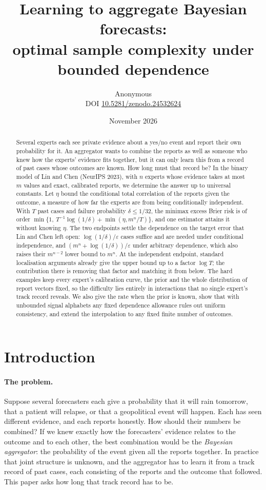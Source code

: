 \documentclass[11pt,a4paper]{article}
\title{Learning to aggregate Bayesian forecasts:\\ optimal sample complexity under bounded dependence}
\author{Anonymous\\[3pt]{\small DOI \href{https://doi.org/10.5281/zenodo.24532624}{10.5281/zenodo.24532624}}}
\date{November 2026}
\theoremstyle{remark}
\newcommand{\eps}{\varepsilon}
\begin{document}
\maketitle
\begin{abstract}
Several experts each see private evidence about a yes/no event and report their own probability for it. An aggregator wants to combine the reports as well as someone who knew how the experts' evidence fits together, but it can only learn this from a record of past cases whose outcomes are known. How long must that record be? In the binary model of Lin and Chen (NeurIPS 2023), with $n$ experts whose evidence takes at most $m$ values and exact, calibrated reports, we determine the answer up to universal constants. Let $\eta$ bound the conditional total correlation of the reports given the outcome, a measure of how far the experts are from being conditionally independent. With $T$ past cases and failure probability $\delta\le1/32$, the minimax excess Brier risk is of order
$\min\{1,\ T^{-1}\log(1/\delta)+\min(\eta,m^n/T)\}$, and one estimator attains it without knowing $\eta$. The two endpoints settle the dependence on the target error that Lin and Chen left open: $\log(1/\delta)/\eps$ cases suffice and are needed under conditional independence, and $(m^n+\log(1/\delta))/\eps$ under arbitrary dependence, which also raises their $m^{n-2}$ lower bound to $m^n$. At the independent endpoint, standard localisation arguments already give the upper bound up to a factor $\log T$; the contribution there is removing that factor and matching it from below. The hard examples keep every expert's calibration curve, the prior and the whole distribution of report vectors fixed, so the difficulty lies entirely in interactions that no single expert's track record reveals. We also give the rate when the prior is known, show that with unbounded signal alphabets any fixed dependence allowance rules out uniform consistency, and extend the interpolation to any fixed finite number of outcomes.
\end{abstract}

\section{Introduction}
\paragraph{The problem.}
Suppose several forecasters each give a probability that it will rain tomorrow, that a patient will relapse, or that a geopolitical event will happen. Each has seen different evidence, and each reports honestly. How should their numbers be combined? If we knew exactly how the forecasters' evidence relates to the outcome and to each other, the best combination would be the \emph{Bayesian aggregator}: the probability of the event given all the reports together. In practice that joint structure is unknown, and the aggregator has to learn it from a track record of past cases, each consisting of the reports and the outcome that followed. This paper asks how long that track record has to be.
\end{document}
